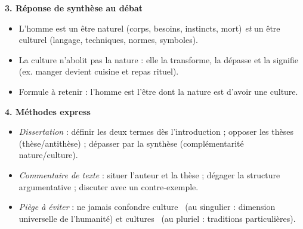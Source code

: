\documentclass[11pt]{article}
\newcommand{\cle}[1]{{\popxbold\color{popdark}#1}}
\begin{document}
\begin{bilan}
\textbf{3. Réponse de synthèse au débat}
\begin{itemize}
  \item L'homme est un être naturel (corps, besoins, instincts, mort) \emph{et} un être culturel (langage, techniques, normes, symboles).
  \item La culture n'abolit pas la nature : elle la \cle{transforme}, la \cle{dépasse} et la \cle{signifie} (ex. manger devient cuisine et repas rituel).
  \item Formule à retenir : l'homme est l'être dont la nature est d'avoir une culture.
\end{itemize}

\textbf{4. Méthodes express}
\begin{itemize}
  \item \emph{Dissertation} : définir les deux termes dès l'introduction ; opposer les thèses (thèse/antithèse) ; dépasser par la synthèse (complémentarité nature/culture).
  \item \emph{Commentaire de texte} : situer l'auteur et la thèse ; dégager la structure argumentative ; discuter avec un contre-exemple.
  \item \emph{Piège à éviter} : ne jamais confondre \guillemotleft culture \guillemotright\ (au singulier : dimension universelle de l'humanité) et \guillemotleft cultures \guillemotright\ (au pluriel : traditions particulières).
\end{itemize}
\end{bilan}
\end{document}

